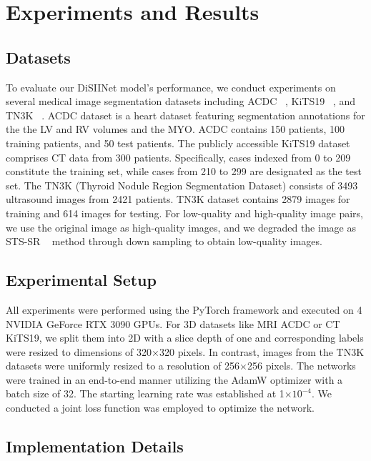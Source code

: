 \documentclass{article}
\begin{document}
\section{Experiments and Results}

\subsection{Datasets}

To evaluate our DiSIINet model's performance, we conduct experiments on several medical image segmentation datasets including ACDC ~\cite{8360453}, KiTS19 ~\cite{heller2021state}, and TN3K ~\cite{gong2021multi}. ACDC dataset is a heart dataset featuring segmentation annotations for the the LV and RV volumes and the MYO. ACDC contains 150 patients, 100 training patients, and 50 test patients. The publicly accessible KiTS19 dataset comprises CT data from 300 patients. Specifically, cases indexed from 0 to 209 constitute the training set, while cases from 210 to 299 are designated as the test set. The TN3K (Thyroid Nodule Region Segmentation Dataset) consists of 3493 ultrasound images from 2421 patients. TN3K dataset contains 2879 images for training and 614 images for testing. For low-quality and high-quality image pairs, we use the original image as high-quality images, and we degraded the image as STS-SR ~\cite{11010915} method through down sampling to obtain low-quality images.


\subsection{Experimental Setup}

All experiments were performed using the PyTorch framework and executed on 4 NVIDIA GeForce RTX 3090 GPUs. For 3D datasets like MRI ACDC or CT KiTS19, we split them into 2D with a slice depth of one and corresponding labels were resized to dimensions of 320$\times$320 pixels. In contrast, images from the TN3K datasets were uniformly resized to a resolution of 256$\times$256 pixels. The networks were trained in an end-to-end manner utilizing the AdamW optimizer with a batch size of 32. The starting learning rate was established at 1$\times$$10^{-4}$. We conducted a joint loss function was employed to optimize the network.

\subsection{Implementation Details}
\end{document}
